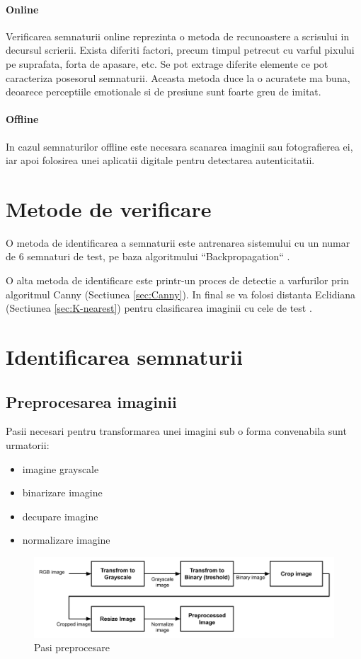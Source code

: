 \documentclass[conference]{IEEEtran}
\begin{document}
\paragraph{Online}
Verificarea semnaturii online reprezinta o metoda de recunoastere a scrisului in decursul scrierii. Exista diferiti factori, precum timpul petrecut cu varful pixului pe suprafata, forta de apasare, etc. Se pot extrage diferite elemente ce pot caracteriza posesorul semnaturii. Aceasta metoda duce la o acuratete ma buna, deoarece perceptiile emotionale si de presiune sunt foarte greu de imitat. 

\paragraph{Offline}
In cazul semnaturilor offline este necesara scanarea imaginii sau fotografierea ei, iar apoi folosirea unei aplicatii digitale pentru detectarea autenticitatii.

\section{Metode de verificare}
O metoda de identificarea a semnaturii este antrenarea sistemului cu un numar de 6 semnaturi de test, pe baza algoritmului ``Backpropagation`` \cite{b1}.

O alta metoda de identificare este printr-un proces de detectie a varfurilor prin algoritmul Canny (Sectiunea \ref{sec:Canny}). In final se va folosi distanta Eclidiana (Sectiunea \ref{sec:K-nearest}) pentru clasificarea imaginii cu cele de test \cite{b2}.

\section{Identificarea semnaturii}

\subsection{Preprocesarea imaginii}
Pasii necesari pentru transformarea unei imagini sub o forma convenabila sunt urmatorii:
\begin{itemize}
	\item imagine grayscale
	\item binarizare imagine
	\item decupare imagine
	\item normalizare imagine
\end{itemize}
\begin{figure}[h!]
	\includegraphics[width=\linewidth]{Figures/TransformationProcess.png}
	\caption{Pasi preprocesare}
	\label{fig:TransformationProcess}
\end{figure}
\end{document}

